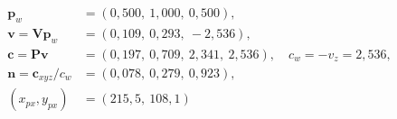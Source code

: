 \begin{align*}
\mathbf{p}_w&=(0{,}500,\ 1{,}000,\ 0{,}500),\\
\mathbf{v}=\mathbf{V}\mathbf{p}_w&=(0{,}109,\ 0{,}293,\ -2{,}536),\\
\mathbf{c}=\mathbf{P}\mathbf{v}&=(0{,}197,\ 0{,}709,\ 2{,}341,\ 2{,}536),\quad c_w=-v_z=2{,}536,\\
\mathbf{n}=\mathbf{c}_{xyz}/c_w&=(0{,}078,\ 0{,}279,\ 0{,}923),\\
(x_{px},y_{px})&=(215{,}5,\ 108{,}1)
\end{align*}
